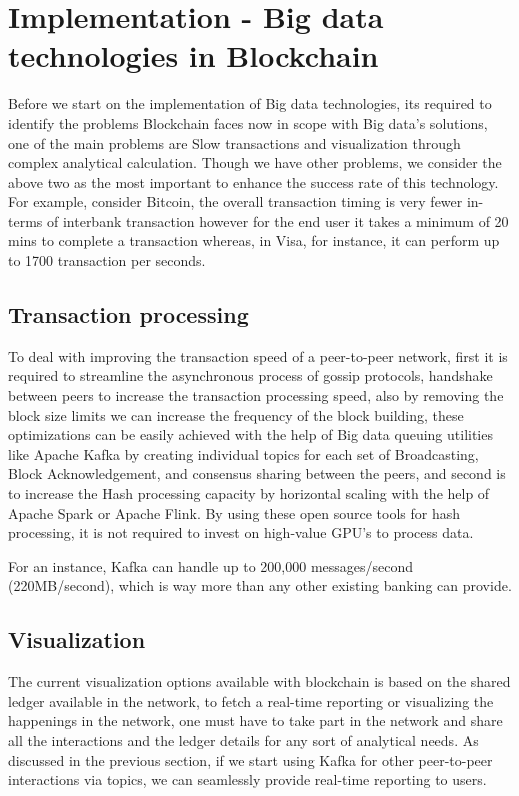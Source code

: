 \documentclass[sigconf]{acmart}
\begin{document}
\section{Implementation - Big data technologies in Blockchain}
Before we start on the implementation of Big data technologies, its required to identify the problems Blockchain faces now in scope with Big data's solutions, one of the main problems are Slow transactions and visualization through complex analytical calculation. Though we have other problems, we consider the above two as the most important to enhance the success rate of this technology.
For example, consider Bitcoin, the overall transaction timing is very fewer in-terms of interbank transaction however for the end user it takes a minimum of 20 mins to complete a transaction whereas, in Visa, for instance, it can perform up to 1700 transaction per seconds.

\subsection{Transaction processing}
To deal with improving the transaction speed of a peer-to-peer network, first it is required to streamline the asynchronous process of gossip protocols, handshake between peers to increase the transaction processing speed, also by removing the block size limits\cite{Optimize-bitcoin} we can increase the frequency of the block building, these optimizations can be easily achieved with the help of Big data queuing utilities like Apache Kafka by creating individual topics for each set of Broadcasting, Block Acknowledgement, and consensus sharing between the peers,   and second is to increase the Hash processing capacity by horizontal scaling with the help of Apache Spark or Apache Flink. By using these open source tools for hash processing, it is not required to invest on high-value GPU's to process data.

For an instance, Kafka can handle up to 200,000 messages/second (220MB/second)\cite{kafka_performance}, which is way more than any other existing banking can provide.



\subsection{Visualization}
The current visualization options available with blockchain is based on the shared ledger available in the network, to fetch a real-time reporting or visualizing the happenings in the network, one must have to take part in the network and share all the interactions and the ledger details for any sort of analytical needs. As discussed in the previous section, if we start using Kafka for other peer-to-peer interactions via topics, we can seamlessly provide real-time reporting to users.
\end{document}
